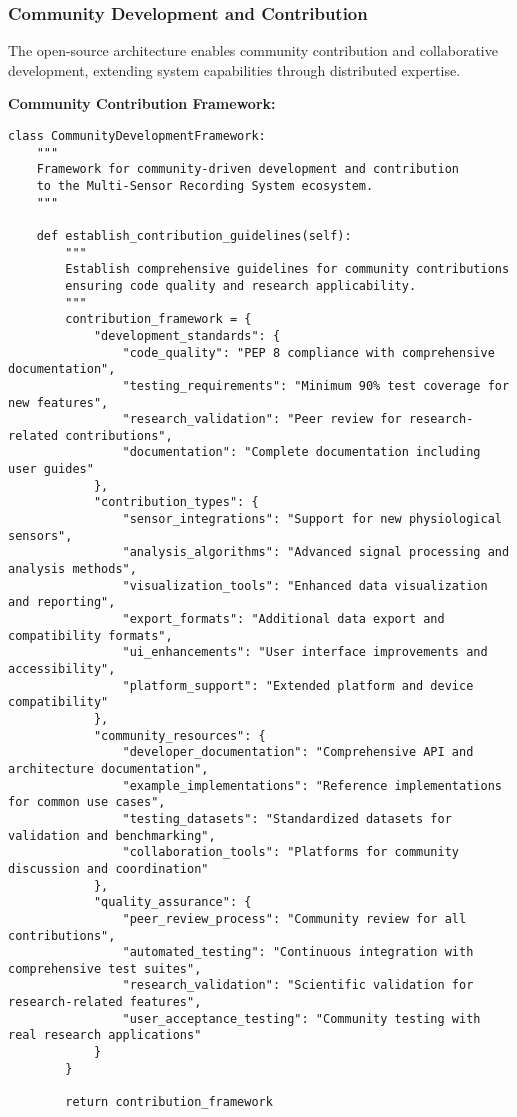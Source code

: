 \documentclass[11pt,a4paper]{article}
\begin{document}
\subsubsection{Community Development and Contribution}

The open-source architecture enables community contribution and collaborative development, extending system capabilities
through distributed expertise.

\textbf{Community Contribution Framework:}

\begin{verbatim}
class CommunityDevelopmentFramework:
    """
    Framework for community-driven development and contribution
    to the Multi-Sensor Recording System ecosystem.
    """

    def establish_contribution_guidelines(self):
        """
        Establish comprehensive guidelines for community contributions
        ensuring code quality and research applicability.
        """
        contribution_framework = {
            "development_standards": {
                "code_quality": "PEP 8 compliance with comprehensive documentation",
                "testing_requirements": "Minimum 90% test coverage for new features",
                "research_validation": "Peer review for research-related contributions",
                "documentation": "Complete documentation including user guides"
            },
            "contribution_types": {
                "sensor_integrations": "Support for new physiological sensors",
                "analysis_algorithms": "Advanced signal processing and analysis methods",
                "visualization_tools": "Enhanced data visualization and reporting",
                "export_formats": "Additional data export and compatibility formats",
                "ui_enhancements": "User interface improvements and accessibility",
                "platform_support": "Extended platform and device compatibility"
            },
            "community_resources": {
                "developer_documentation": "Comprehensive API and architecture documentation",
                "example_implementations": "Reference implementations for common use cases",
                "testing_datasets": "Standardized datasets for validation and benchmarking",
                "collaboration_tools": "Platforms for community discussion and coordination"
            },
            "quality_assurance": {
                "peer_review_process": "Community review for all contributions",
                "automated_testing": "Continuous integration with comprehensive test suites",
                "research_validation": "Scientific validation for research-related features",
                "user_acceptance_testing": "Community testing with real research applications"
            }
        }

        return contribution_framework
\end{verbatim}
\end{document}
